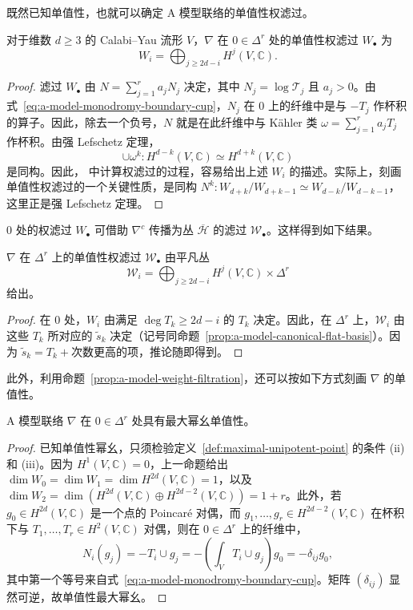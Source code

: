 既然已知单值性，也就可以确定 A 模型联络的单值性权滤过。
\begin{proposition}\label{prop:a-model-weight-filtration}
对于维数 $d\ge3$ 的 Calabi--Yau 流形 $V$，$\nabla$ 在 $0\in\Delta^r$ 处的单值性权滤过 $W_\bullet$ 为
\[
W_i=\bigoplus_{j\ge2d-i}H^j(V,\mathbb C).
\]
\end{proposition}
\begin{proof}
滤过 $W_\bullet$ 由 $N=\sum_{j=1}^ra_jN_j$ 决定，其中 $N_j=\log\mathcal T_j$ 且 $a_j>0$。由式~\eqref{eq:a-model-monodromy-boundary-cup}，$N_j$ 在 $0$ 上的纤维中是与 $-T_j$ 作杯积的算子。因此，除去一个负号，$N$ 就是在此纤维中与 Kähler 类 $\omega=\sum_{j=1}^ra_jT_j$ 作杯积。由强 Lefschetz 定理，
\[
\cup\omega^k:H^{d-k}(V,\mathbb C)\simeq H^{d+k}(V,\mathbb C)
\]
是同构。因此， 中计算权滤过的过程，容易给出上述 $W_i$ 的描述。实际上，刻画单值性权滤过的一个关键性质，是同构 $N^k:W_{d+k}/W_{d+k-1}\simeq W_{d-k}/W_{d-k-1}$，这里正是强 Lefschetz 定理。
\end{proof}
$0$ 处的权滤过 $W_\bullet$ 可借助 $\nabla^c$ 传播为丛 $\overline{\mathcal H}$ 的滤过 $\mathcal W_\bullet$。这样得到如下结果。
\begin{corollary}\label{cor:a-model-weight-bundles}
$\nabla$ 在 $\Delta^r$ 上的单值性权滤过 $\mathcal W_\bullet$ 由平凡丛
\[
\mathcal W_i=\bigoplus_{j\ge2d-i}H^j(V,\mathbb C)\times\Delta^r
\]
给出。
\end{corollary}
\begin{proof}
在 $0$ 处，$W_i$ 由满足 $\deg T_k\ge2d-i$ 的 $T_k$ 决定。因此，在 $\Delta^r$ 上，$\mathcal W_i$ 由这些 $T_k$ 所对应的 $\widetilde s_k$ 决定（记号同命题~\ref{prop:a-model-canonical-flat-basis}）。因为 $\widetilde s_k=T_k+\text{次数更高的项}$，推论随即得到。
\end{proof}
此外，利用命题~\ref{prop:a-model-weight-filtration}，还可以按如下方式刻画 $\nabla$ 的单值性。
\begin{corollary}\label{cor:a-model-maximal-unipotent}
A 模型联络 $\nabla$ 在 $0\in\Delta^r$ 处具有最大幂幺单值性。
\end{corollary}
\begin{proof}
已知单值性幂幺，只须检验定义~\ref{def:maximal-unipotent-point} 的条件 (ii) 和 (iii)。因为 $H^1(V,\mathbb C)=0$，上一命题给出 $\dim W_0=\dim W_1=\dim H^{2d}(V,\mathbb C)=1$，以及 $\dim W_2=\dim(H^{2d}(V,\mathbb C)\oplus H^{2d-2}(V,\mathbb C))=1+r$。此外，若 $g_0\in H^{2d}(V,\mathbb C)$ 是一个点的 Poincaré 对偶，而 $g_1,\ldots,g_r\in H^{2d-2}(V,\mathbb C)$ 在杯积下与 $T_1,\ldots,T_r\in H^2(V,\mathbb C)$ 对偶，则在 $0\in\Delta^r$ 上的纤维中，
\[
N_i(g_j)=-T_i\cup g_j=-\left(\int_VT_i\cup g_j\right)g_0=-\delta_{ij}g_0,
\]
其中第一个等号来自式~\eqref{eq:a-model-monodromy-boundary-cup}。矩阵 $(\delta_{ij})$ 显然可逆，故单值性最大幂幺。
\end{proof}

